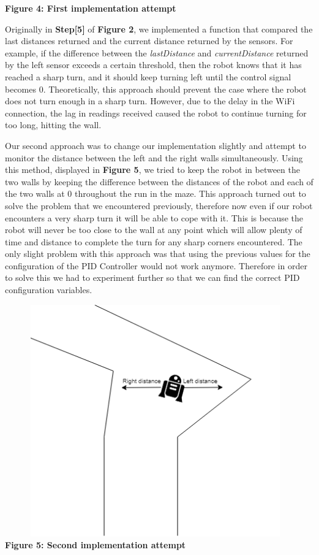 \documentclass[hidelinks,a4paper,11pt]{article}
\begin{document}
\begin{mdframed}
\begin{center}
\textbf{Figure 4: First implementation attempt}
\end{center}
Originally in \textbf{Step[5]} of \textbf{Figure 2}, we implemented a function that compared the
last distances returned and the current distance returned by  the sensors. For example, if the
difference between the \emph{lastDistance} and \emph{currentDistance} returned by the left sensor
exceeds a certain threshold, then the robot knows that it has reached a sharp turn, and it should
keep turning left until the control signal becomes 0. Theoretically, this approach should prevent
the case where the robot does not turn enough in a sharp turn. However, due to the delay in the WiFi
connection, the lag in readings received caused the robot to continue turning for too long, hitting
the wall.

Our second approach was to change our implementation slightly and attempt to monitor the
distance between the left and the right walls simultaneously. Using this method, displayed in
\textbf{Figure 5}, we tried to keep the robot in between the two walls by keeping the difference
between the distances of the robot and each of the two walls at 0 throughout the run in the maze.
This approach turned out to solve the problem that we encountered previously, therefore now even if
our robot encounters a very sharp turn it will be able to cope with it. This is because the robot
will never be too close to the wall at any point which will allow plenty of time and distance to
complete the turn for any sharp corners encountered. The only slight problem with this approach was
that using the previous values for the configuration of the PID Controller would not work anymore.
Therefore in order to solve this we had to experiment further so that we can find the correct PID
configuration variables.
\vspace*{\baselineskip}
\begin{center}
\includegraphics[width=13cm, height=10cm]{TwoWall.png}
\textbf{Figure 5: Second implementation attempt}
\end{center}


\end{mdframed}
\end{document}
